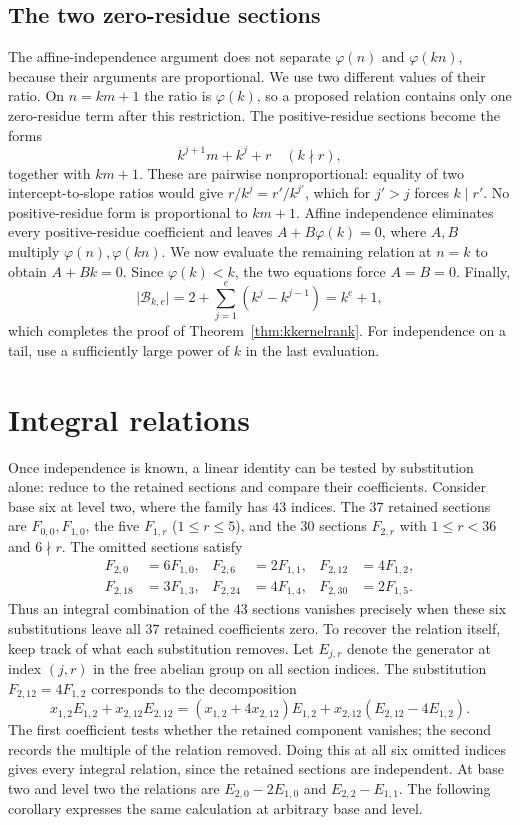 \documentclass[11pt]{article}
\begin{document}
\subsection*{The two zero-residue sections}
The affine-independence argument does not separate $\varphi(n)$ and
$\varphi(kn)$, because their arguments are proportional. We use two
different values of their ratio. On $n=km+1$ the ratio is
$\varphi(k)$, so a proposed relation contains only one zero-residue
term after this restriction.
The positive-residue sections become the forms
\[
 k^{j+1}m+k^j+r\quad(k\nmid r),
\]
together with $km+1$. These are pairwise nonproportional: equality of
two intercept-to-slope ratios would give
$r/k^j=r'/k^{j'}$, which for $j'>j$ forces $k\mid r'$.
No positive-residue form is proportional to $km+1$.
Affine independence eliminates every positive-residue coefficient
and leaves $A+B\varphi(k)=0$, where $A,B$ multiply
$\varphi(n),\varphi(kn)$. We now evaluate the remaining relation
at $n=k$ to obtain $A+Bk=0$. Since $\varphi(k)<k$, the two
equations force $A=B=0$. Finally,
\[
 \lvert\mathcal B_{k,e}\rvert
   =2+\sum_{j=1}^e(k^j-k^{j-1})=k^e+1,
\]
which completes the proof of Theorem~\ref{thm:kkernelrank}.
For independence on a tail, use a sufficiently large power of $k$
in the last evaluation.

\section{Integral relations}\label{sec:base-six-test}
Once independence is known, a linear identity can be tested by
substitution alone: reduce to the retained sections and compare their
coefficients. Consider base six at level two, where the family has
$43$ indices.
The $37$ retained sections are $F_{0,0},F_{1,0}$, the five
$F_{1,r}$ ($1\le r\le5$), and the $30$ sections $F_{2,r}$ with
$1\le r<36$ and $6\nmid r$. The omitted sections satisfy
\[
\begin{aligned}
 F_{2,0}&=6F_{1,0}, & F_{2,6}&=2F_{1,1}, & F_{2,12}&=4F_{1,2},\\
 F_{2,18}&=3F_{1,3}, & F_{2,24}&=4F_{1,4}, & F_{2,30}&=2F_{1,5}.
\end{aligned}
\]
Thus an integral combination of the $43$ sections vanishes precisely
when these six substitutions leave all $37$ retained coefficients zero.
To recover the relation itself, keep track of what each substitution
removes. Let $E_{j,r}$ denote the generator at index $(j,r)$ in the
free abelian group on all section indices. The substitution
$F_{2,12}=4F_{1,2}$ corresponds to the decomposition
\[
 x_{1,2}E_{1,2}+x_{2,12}E_{2,12}
 = (x_{1,2}+4x_{2,12})E_{1,2}
   +x_{2,12}(E_{2,12}-4E_{1,2}).
\]
The first coefficient tests whether the retained component vanishes;
the second records the multiple of the relation removed. Doing this
at all six omitted indices gives every integral relation, since the
retained sections are independent. At base two and level two the
relations are $E_{2,0}-2E_{1,0}$ and $E_{2,2}-E_{1,1}$.
The following corollary expresses the same calculation at arbitrary
base and level.
\end{document}
